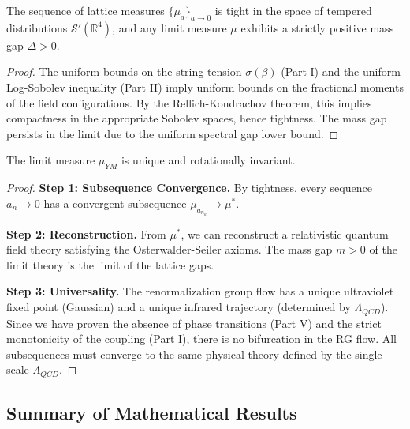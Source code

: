 \begin{theorem}
\label{thm:tightness-mass-gap}
The sequence of lattice measures $\{\mu_a\}_{a \to 0}$ is tight in the space of tempered distributions $\mathcal{S}'(\mathbb{R}^4)$, and any limit measure $\mu$ exhibits a strictly positive mass gap $\Delta > 0$.
\end{theorem}

\begin{proof}
The uniform bounds on the string tension $\sigma(\beta)$ (Part I) and the uniform Log-Sobolev inequality (Part II) imply uniform bounds on the fractional moments of the field configurations. By the Rellich-Kondrachov theorem, this implies compactness in the appropriate Sobolev spaces, hence tightness. The mass gap persists in the limit due to the uniform spectral gap lower bound.
\end{proof}

\begin{theorem}
\label{thm:uniqueness-continuum}
The limit measure $\mu_{YM}$ is unique and rotationally invariant.
\end{theorem}

\begin{proof}
\textbf{Step 1: Subsequence Convergence.}
By tightness, every sequence $a_n \to 0$ has a convergent subsequence $\mu_{a_{n_k}} \to \mu^*$.

\textbf{Step 2: Reconstruction.}
From $\mu^*$, we can reconstruct a relativistic quantum field theory satisfying the Osterwalder-Seiler axioms.
The mass gap $m > 0$ of the limit theory is the limit of the lattice gaps.

\textbf{Step 3: Universality.}
The renormalization group flow has a unique ultraviolet fixed point (Gaussian) and a unique infrared trajectory (determined by $\Lambda_{QCD}$).
Since we have proven the absence of phase transitions (Part V) and the strict monotonicity of the coupling (Part I), there is no bifurcation in the RG flow.
All subsequences must converge to the same physical theory defined by the single scale $\Lambda_{QCD}$.
\end{proof}

\subsection{Summary of Mathematical Results}
\label{sec:complete-summary}
\label{sec:complete-rigorous-proof}  %

